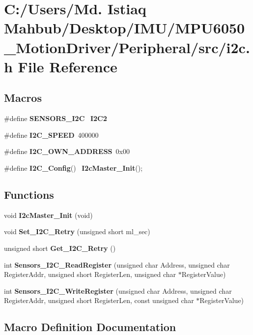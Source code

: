 \section{C\+:/\+Users/\+Md. Istiaq Mahbub/\+Desktop/\+I\+M\+U/\+M\+P\+U6050\+\_\+\+Motion\+Driver/\+Peripheral/src/i2c.h File Reference}
\label{i2c_8h}
\subsection*{Macros}
\begin{DoxyCompactItemize}
\item 
\#define \textbf{ S\+E\+N\+S\+O\+R\+S\+\_\+\+I2C}~\textbf{ I2\+C2}
\item 
\#define \textbf{ I2\+C\+\_\+\+S\+P\+E\+ED}~400000
\item 
\#define \textbf{ I2\+C\+\_\+\+O\+W\+N\+\_\+\+A\+D\+D\+R\+E\+SS}~0x00
\item 
\#define \textbf{ I2\+C\+\_\+\+Config}()~\textbf{ I2c\+Master\+\_\+\+Init}();
\end{DoxyCompactItemize}
\subsection*{Functions}
\begin{DoxyCompactItemize}
\item 
void \textbf{ I2c\+Master\+\_\+\+Init} (void)
\item 
void \textbf{ Set\+\_\+\+I2\+C\+\_\+\+Retry} (unsigned short ml\+\_\+sec)
\item 
unsigned short \textbf{ Get\+\_\+\+I2\+C\+\_\+\+Retry} ()
\item 
int \textbf{ Sensors\+\_\+\+I2\+C\+\_\+\+Read\+Register} (unsigned char Address, unsigned char Register\+Addr, unsigned short Register\+Len, unsigned char $\ast$Register\+Value)
\item 
int \textbf{ Sensors\+\_\+\+I2\+C\+\_\+\+Write\+Register} (unsigned char Address, unsigned char Register\+Addr, unsigned short Register\+Len, const unsigned char $\ast$Register\+Value)
\end{DoxyCompactItemize}


\subsection{Macro Definition Documentation}
\mbox{\label{i2c_8h_aaade177dea4921da887f3c4c5b8f7bb4}} 
